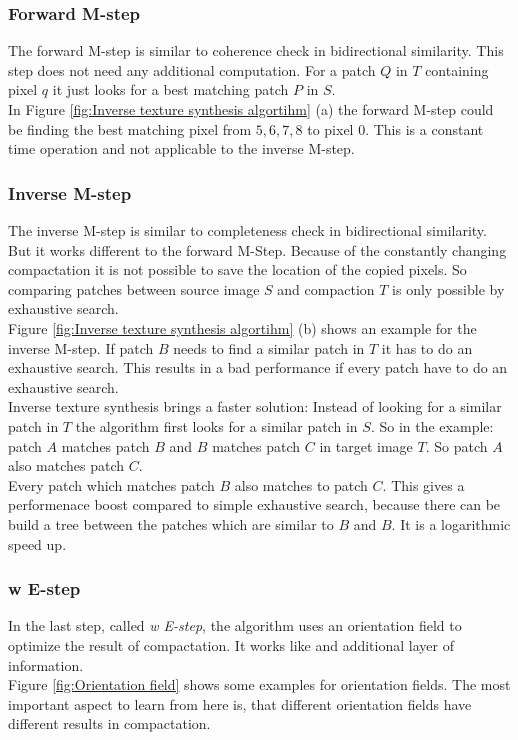 \subsubsection{Forward M-step}
The forward M-step is similar to coherence check in bidirectional similarity. This step does not need any additional computation. For a patch $Q$ in $T$ containing pixel $q$ it just looks for a best matching patch $P$ in $S$.\\
In Figure \ref{fig:Inverse texture synthesis algortihm} (a) the forward M-step could be finding the best matching pixel from ${5,6,7,8}$ to pixel $0$. This is a constant time operation and not applicable to the inverse M-step. 

\subsubsection{Inverse M-step}
The inverse M-step is similar to completeness check in bidirectional similarity. But it works different to the forward M-Step. Because of the constantly changing compactation it is not possible to save the location of the copied pixels. So comparing patches between source image $S$ and compaction $T$ is only possible by exhaustive search.\\
Figure \ref{fig:Inverse texture synthesis algortihm} (b) shows an example for the inverse M-step. If patch $B$ needs to find a similar patch in $T$ it has to do an exhaustive search. This results in a bad performance if every patch have to do an exhaustive search.\\
Inverse texture synthesis brings a faster solution: Instead of looking for a similar patch in $T$ the algorithm first looks for a similar patch in $S$. So in the example: patch $A$ matches patch $B$ and $B$ matches patch $C$ in target image $T$. So patch $A$ also matches patch $C$.\\
Every patch which matches patch $B$ also matches to patch $C$. This gives a performenace boost compared to simple exhaustive search, because there can be build a tree between the patches which are similar to $B$ and $B$. It is a logarithmic speed up.


\subsubsection{w E-step}
In the last step, called \textit{w E-step}, the algorithm uses an orientation field to optimize the result of compactation. It works like and additional layer of information.\\
Figure \ref{fig:Orientation field} shows some examples for orientation fields. The most important aspect to learn from here is, that different orientation fields have different results in compactation.

